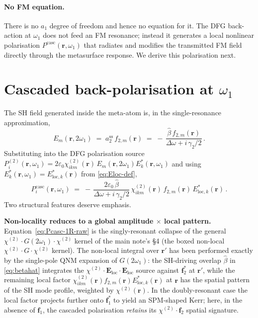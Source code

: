 \documentclass[11pt,a4paper]{article}
\newcommand{\eps}{\varepsilon}
\newcommand{\bvec}[1]{\mathbf{#1}}
\newcommand{\E}{\bvec{E}}
\newcommand{\f}{\bvec{f}}
\newcommand{\ri}{\bvec{r}}
\newcommand{\chitwo}{\chi^{(2)}}
\newcommand{\Dom}{\Delta\omega}
\newcommand{\Einc}{\E_{\text{loc}}}
\begin{document}
\paragraph{No FM equation.}
There is no $a_1$ degree of freedom and hence no equation for it.  The
DFG back-action at $\omega_1$ does not feed an FM resonance; instead it
generates a local nonlinear polarisation $P^{\text{casc}}(\ri,\omega_1)$
that radiates and modifies the transmitted FM field directly through the
metasurface response.  We derive this polarisation next.

\section{Cascaded back-polarisation at \texorpdfstring{$\omega_1$}{ω₁}}\label{sec:Pcasc-1R}

The SH field generated inside the meta-atom is, in the single-resonance
approximation,
\begin{equation}
  E_m(\ri,2\omega_1)\;=\;a_2^{\text{ss}}\,f_{2,m}(\ri)
   \;=\;-\,\frac{\hat\beta\,f_{2,m}(\ri)}{\Dom+i\,\gamma_2/2}\,.
  \label{eq:Esh-1R}
\end{equation}
Substituting into the DFG polarisation source
$P_i^{(2)}(\ri,\omega_1)=2\eps_0\chitwo_{ikm}(\ri)\,E_m(\ri,2\omega_1)
E_k^{*}(\ri,\omega_1)$ and using
$E_k^{*}(\ri,\omega_1)=E_{\text{loc},k}^{*}(\ri)$ from \eqref{eq:Eloc-def},
\begin{equation}
  P_i^{\text{casc}}(\ri,\omega_1)
   \;=\;-\,\frac{2\eps_0\,\hat\beta}{\Dom+i\,\gamma_2/2}\,
        \chitwo_{ikm}(\ri)\,f_{2,m}(\ri)\,E_{\text{loc},k}^{*}(\ri)\,.
  \label{eq:Pcasc-1R-raw}
\end{equation}
Two structural features deserve emphasis.

\textbf{Non-locality reduces to a global amplitude $\times$ local pattern.}
Equation~\eqref{eq:Pcasc-1R-raw} is the singly-resonant collapse of the
general $\chitwo\!\cdot\!G(2\omega_1)\!\cdot\!\chitwo$ kernel of the main
note's \S 4 (the boxed non-local $\chitwo\!\cdot\!G\!\cdot\!\chitwo$ kernel).  The non-local
integral over $\ri'$ has been performed exactly by the single-pole QNM
expansion of $G(2\omega_1)$: the SH-driving overlap $\hat\beta$ in
\eqref{eq:betahat} integrates the $\chitwo\!\cdot\!\Einc\!\cdot\!\Einc$
source against $\f_2^{*}$ at $\ri'$, while the remaining local factor
$\chitwo_{ikm}(\ri)f_{2,m}(\ri)E_{\text{loc},k}^{*}(\ri)$ at $\ri$ has the spatial
pattern of the SH mode profile, weighted by $\chitwo(\ri)$.  In the
doubly-resonant case the local factor projects further onto $\f_1^{*}$ to
yield an SPM-shaped Kerr; here, in the absence of $\f_1$, the cascaded
polarisation \emph{retains} its $\chitwo\cdot\f_2$ spatial signature.
\end{document}
